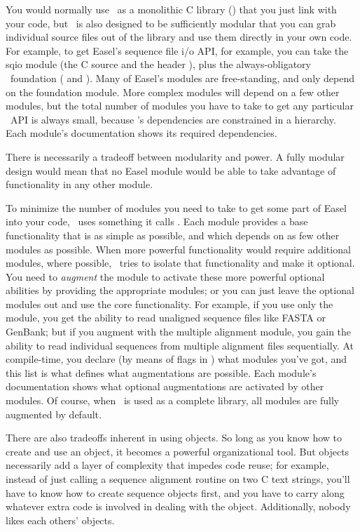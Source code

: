 You would normally use \Easel\ as a monolithic C library
() that you just link with your code, but \Easel\ is
also designed to be sufficiently modular that you can grab individual
source files out of the library and use them directly in your own
code. For example, to get Easel's sequence file i/o API, for example,
you can take the sqio module (the C source  and the
header ), plus the always-obligatory \Easel\
foundation ( and ). Many of Easel's
modules are free-standing, and only depend on the foundation
 module. More complex modules will depend on a few other
modules, but the total number of modules you have to take to get any
particular \Easel\ API is always small, because \Easel's dependencies
are constrained in a hierarchy. Each module's documentation shows its
required dependencies.

There is necessarily a tradeoff between modularity and power. A fully
modular design would mean that no Easel module would be able to take
advantage of functionality in any other module. 

To minimize the number of modules you need to take to get some part of
Easel into your code, \Easel\ uses something it calls
. Each module provides a base functionality that
is as simple as possible, and which depends on as few other modules as
possible. When more powerful functionality would require additional
modules, where possible, \Easel\ tries to isolate that functionality
and make it optional. You need to \emph{augment} the module to
activate these more powerful optional abilities by providing the
appropriate modules; or you can just leave the optional modules out
and use the core functionality.  For example, if you use only the
 module, you get the ability to read unaligned sequence
files like FASTA or GenBank; but if you augment \eslmod{sqio} with the
\eslmod{msa} multiple alignment module, you gain the ability to read
individual sequences from multiple alignment files sequentially. At
compile-time, you declare (by means of \ccode{\#define} flags in
\ccode{easel.h}) what modules you've got, and this list is what
defines what augmentations are possible. Each module's documentation
shows what optional augmentations are activated by other modules. Of
course, when \Easel\ is used as a complete \ccode{libeasel.a} library,
all modules are fully augmented by default.

There are also tradeoffs inherent in using objects. So long as you
know how to create and use an object, it becomes a powerful
organizational tool. But objects necessarily add a layer of complexity
that impedes code reuse; for example, instead of just calling a
sequence alignment routine on two C text strings, you'll have to know
how to create sequence objects first, and you have to carry along
whatever extra code is involved in dealing with the
object. Additionally, nobody likes each others' objects.

